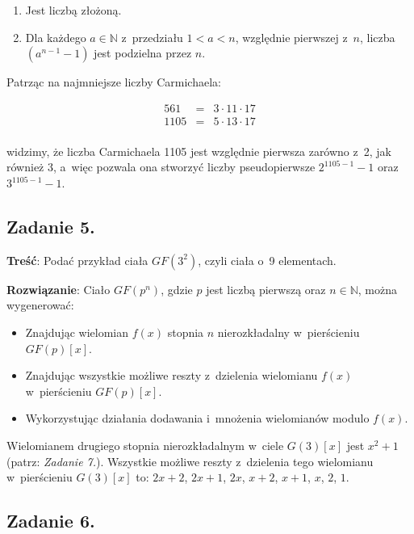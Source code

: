 \documentclass[a4paper,10pt, twocolumn]{article}
\begin{document}
\begin{enumerate}
 \item Jest liczbą złożoną.
 \item Dla każdego $a \in \mathbb{N}$ z~przedziału $1 < a < n$, względnie pierwszej z~$n$, liczba $(a^{n-1} - 1)$ jest podzielna przez $n$.
\end{enumerate}

Patrząc na najmniejsze liczby Carmichaela:

\begin{equation*}
 \begin{array}{lcl} 561& = & 3 \cdot 11 \cdot 17 \\ 1105 & = & 5 \cdot 13 \cdot 17 \\ \end{array}
\end{equation*}

\noindent widzimy, że liczba Carmichaela 1105 jest względnie pierwsza zarówno z~2, jak również 3, a~więc pozwala ona stworzyć liczby pseudopierwsze $2^{1105 - 1} - 1$ oraz $3^{1105 - 1} - 1$.

\subsection{Zadanie 5.}

\textbf{Treść}: Podać przykład ciała $GF(3^{2})$, czyli ciała o~9 elementach.

\textbf{Rozwiązanie}: Ciało $GF(p^{n})$, gdzie $p$ jest liczbą pierwszą oraz $n \in \mathbb{N}$, można wygenerować:

\begin{itemize}
 \item Znajdując wielomian $f(x)$ stopnia $n$ nierozkładalny w~pierścieniu $GF(p)[x]$.
 \item Znajdując wszystkie możliwe reszty z~dzielenia wielomianu $f(x)$ w~pierścieniu $GF(p)[x]$.
 \item Wykorzystując działania dodawania i~mnożenia wielomianów modulo $f(x)$.
\end{itemize}

Wielomianem drugiego stopnia nierozkładalnym w~ciele $G(3)[x]$ jest $x^2 + 1$ (patrz: \emph{Zadanie 7.}). Wszystkie możliwe reszty z~dzielenia tego wielomianu w~pierścieniu $G(3)[x]$ to: $2x + 2$, $2x + 1$, $2x$, $x + 2$, $x + 1$, $x$, $2$, $1$.

\subsection{Zadanie 6.}
\end{document}
